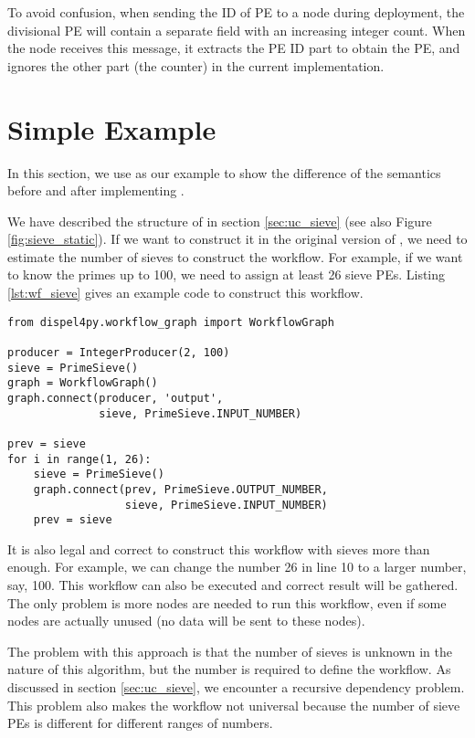 To avoid confusion, when sending the ID of PE to a node during deployment, the divisional PE will contain a separate field with an increasing integer count. When the node receives this message, it extracts the PE ID part to obtain the PE, and ignores the other part (\ie the counter) in the current implementation.

\section{Simple Example} \label{sec:dynexp_example}
In this section, we use \ttsieve as our example to show the difference of the semantics before and after implementing \tdynexp.

We have described the structure of \ttsieve in section \ref{sec:uc_sieve} (see also Figure \ref{fig:sieve_static}). If we want to construct it in the original version of \dpy, we need to estimate the number of sieves to construct the workflow. For example, if we want to know the primes up to 100, we need to assign at least 26 sieve PEs. Listing \ref{lst:wf_sieve} gives an example code to construct this workflow.

\begin{lstlisting}[frame=single,caption={Example code of the sieve workflow construction in the old semantics (suppose IntegerProducer and PrimeSieve are already defined)},captionpos=b,label={lst:wf_sieve}]
from dispel4py.workflow_graph import WorkflowGraph

producer = IntegerProducer(2, 100)
sieve = PrimeSieve()
graph = WorkflowGraph()
graph.connect(producer, 'output',
              sieve, PrimeSieve.INPUT_NUMBER)

prev = sieve
for i in range(1, 26):
    sieve = PrimeSieve()
    graph.connect(prev, PrimeSieve.OUTPUT_NUMBER,
                  sieve, PrimeSieve.INPUT_NUMBER)
    prev = sieve
\end{lstlisting}

It is also legal and correct to construct this workflow with sieves more than enough. For example, we can change the number 26 in line 10 to a larger number, say, 100. This workflow can also be executed and correct result will be gathered. The only problem is more nodes are needed to run this workflow, even if some nodes are actually unused (\ie no data will be sent to these nodes).

The problem with this approach is that the number of sieves is unknown in the nature of this algorithm, but the number is required to define the workflow. As discussed in section \ref{sec:uc_sieve}, we encounter a recursive dependency problem. This problem also makes the workflow not universal because the number of sieve PEs is different for different ranges of numbers.

